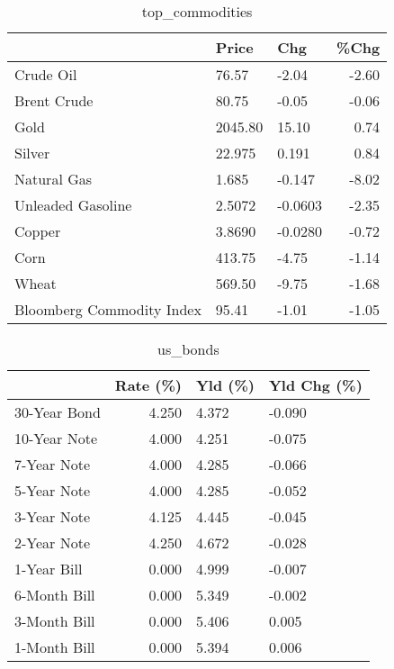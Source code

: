 \documentclass{article}%
\begin{document}
\begin{table}[htbp]%
\caption{top\_commodities}%
\centering%
\begin{adjustbox}{width=1\textwidth}%
\begin{tabular}{lllr}
\toprule
                          &   Price &     Chg &  \%Chg \\
\midrule
               Crude Oil  &   76.57 &   -2.04 & -2.60 \\
             Brent Crude  &   80.75 &   -0.05 & -0.06 \\
                    Gold  & 2045.80 &   15.10 &  0.74 \\
                  Silver  &  22.975 &   0.191 &  0.84 \\
             Natural Gas  &   1.685 &  -0.147 & -8.02 \\
       Unleaded Gasoline  &  2.5072 & -0.0603 & -2.35 \\
                  Copper  &  3.8690 & -0.0280 & -0.72 \\
                    Corn  &  413.75 &   -4.75 & -1.14 \\
                   Wheat  &  569.50 &   -9.75 & -1.68 \\
Bloomberg Commodity Index &   95.41 &   -1.01 & -1.05 \\
\bottomrule
\end{tabular}
%
\end{adjustbox}%
\end{table}

%


\begin{table}[htbp]%
\caption{us\_bonds}%
\centering%
\begin{adjustbox}{width=1\textwidth}%
\begin{tabular}{lrll}
\toprule
             &  Rate (\%) & Yld (\%) & Yld Chg (\%) \\
\midrule
30-Year Bond &     4.250 &   4.372 &      -0.090 \\
10-Year Note &     4.000 &   4.251 &      -0.075 \\
 7-Year Note &     4.000 &   4.285 &      -0.066 \\
 5-Year Note &     4.000 &   4.285 &      -0.052 \\
 3-Year Note &     4.125 &   4.445 &      -0.045 \\
 2-Year Note &     4.250 &   4.672 &      -0.028 \\
 1-Year Bill &     0.000 &   4.999 &      -0.007 \\
6-Month Bill &     0.000 &   5.349 &      -0.002 \\
3-Month Bill &     0.000 &   5.406 &       0.005 \\
1-Month Bill &     0.000 &   5.394 &       0.006 \\
\bottomrule
\end{tabular}
%
\end{adjustbox}%
\end{table}
\end{document}
